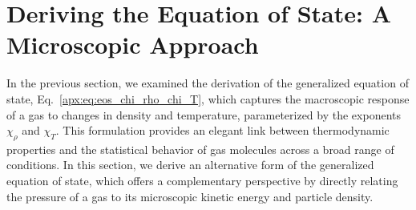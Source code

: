 \documentclass[main.tex]{subfiles}
\begin{document}
\section{Deriving the Equation of State: A Microscopic Approach}
In the previous section, we examined the derivation of the generalized equation of state, Eq.~\eqref{apx:eq:eos_chi_rho_chi_T}, which captures the macroscopic response of a gas to changes in density and temperature, parameterized by the exponents $\chi_\rho$ and $\chi_T$.
This formulation provides an elegant link between thermodynamic properties and the statistical behavior of gas molecules across a broad range of conditions.
In this section, we derive an alternative form of the generalized equation of state, which offers a complementary perspective by directly relating the pressure of a gas to its microscopic kinetic energy and particle density.
\end{document}
